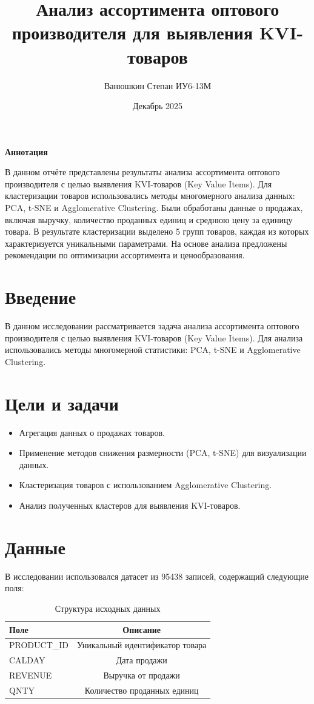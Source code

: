 \documentclass[12pt, a4paper]{article}
\title{Анализ ассортимента оптового производителя для выявления KVI-товаров}
\author{Ванюшкин Степан ИУ6-13М}
\date{Декабрь 2025}
\begin{document}
\maketitle

\begin{center}
\textbf{Аннотация}
\end{center}
\noindent
В данном отчёте представлены результаты анализа ассортимента оптового производителя с целью выявления KVI-товаров (Key Value Items). Для кластеризации товаров использовались методы многомерного анализа данных: PCA, t-SNE и Agglomerative Clustering. Были обработаны данные о продажах, включая выручку, количество проданных единиц и среднюю цену за единицу товара. В результате кластеризации выделено 5 групп товаров, каждая из которых характеризуется уникальными параметрами. На основе анализа предложены рекомендации по оптимизации ассортимента и ценообразования.

\newpage
\tableofcontents
\newpage

\section{Введение}
В данном исследовании рассматривается задача анализа ассортимента оптового производителя с целью выявления KVI-товаров (Key Value Items). Для анализа использовались методы многомерной статистики: PCA, t-SNE и Agglomerative Clustering.

\section{Цели и задачи}
\begin{itemize}
    \item Агрегация данных о продажах товаров.
    \item Применение методов снижения размерности (PCA, t-SNE) для визуализации данных.
    \item Кластеризация товаров с использованием Agglomerative Clustering.
    \item Анализ полученных кластеров для выявления KVI-товаров.
\end{itemize}

\section{Данные}
В исследовании использовался датасет из 95438 записей, содержащий следующие поля:

\begin{table}[h]
    \centering
    \begin{tabular}{lc}
        \toprule
        \textbf{Поле} & \textbf{Описание} \\
        \midrule
        PRODUCT\_ID & Уникальный идентификатор товара \\
        CALDAY & Дата продажи \\
        REVENUE & Выручка от продажи \\
        QNTY & Количество проданных единиц \\
        \bottomrule
    \end{tabular}
    \caption{Структура исходных данных}
\end{table}
\end{document}
